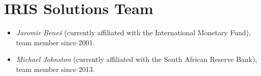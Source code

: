 
\section*{IRIS Solutions Team}

\begin{itemize}

\item \textit{Jarom\'\i r Bene\v s} (currently affiliated with the International Monetary Fund), team member since 2001.

\item \textit{Michael Johnston} (currently affiliated with the South African Reserve Bank), team member since 2013.

\end{itemize}